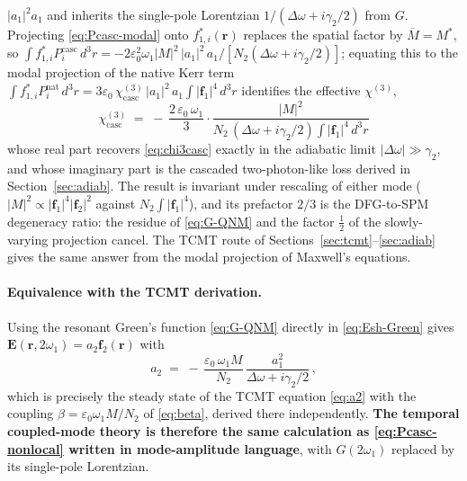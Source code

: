 \documentclass[11pt,a4paper]{article}
\newcommand{\eps}{\varepsilon}
\newcommand{\bvec}[1]{\mathbf{#1}}
\newcommand{\f}{\bvec{f}}
\newcommand{\ri}{\bvec{r}}
\newcommand{\dthreer}{\,d^{3}r}
\newcommand{\chithree}{\chi^{(3)}}
\newcommand{\Dom}{\Delta\omega}
\begin{document}
\begin{itemize}
    $|a_1|^{2}a_1$ and inherits the single-pole Lorentzian
    $1/(\Dom+i\gamma_2/2)$ from $G$.  Projecting \eqref{eq:Pcasc-modal}
    onto $f_{1,i}^{*}(\ri)$ replaces the spatial factor by
    $\overline M=M^{*}$, so $\int f_{1,i}^{*}P_i^{\text{casc}}\dthreer
     =-2\eps_0^2\omega_1|M|^{2}\,|a_1|^{2}\,a_1/[N_2(\Dom+i\gamma_2/2)]$;
    equating this to the modal projection of the native Kerr term
    $\int f_{1,i}^{*}P_i^{\text{nat}}\dthreer
     =3\eps_0\,\chithree_\text{casc}\,|a_1|^{2}\,a_1\!\int|\f_1|^{4}\dthreer$
    identifies the effective $\chithree$,
    \begin{equation}
      \boxed{\;\chithree_{\text{casc}}\;=\;
        -\,\frac{2\,\eps_0\,\omega_1}{3}\cdot
        \frac{|M|^2}{N_2\,(\Dom+i\gamma_2/2)\!\int\!|\f_1|^4\dthreer}\;}
      \label{eq:chi3casc-tensor}
    \end{equation}
    whose real part recovers \eqref{eq:chi3casc} exactly in the
    adiabatic limit $|\Dom|\gg\gamma_2$, and whose imaginary part is
    the cascaded two-photon-like loss derived in
    Section~\ref{sec:adiab}.  The result is invariant under rescaling
    of either mode ($|M|^2\propto|\f_1|^4|\f_2|^2$ against
    $N_2\int|\f_1|^4$), and its prefactor $2/3$ is the DFG-to-SPM
    degeneracy ratio: the residue of \eqref{eq:G-QNM} and the factor
    $\tfrac12$ of the slowly-varying projection cancel.  The TCMT route
    of Sections~\ref{sec:tcmt}--\ref{sec:adiab} gives the same answer
    from the modal projection of Maxwell's equations.
\end{itemize}

\paragraph{Equivalence with the TCMT derivation.}
Using the resonant Green's function \eqref{eq:G-QNM} directly in
\eqref{eq:Esh-Green} gives $\mathbf E(\ri,2\omega_1)=a_2\f_2(\ri)$
with
\begin{equation}
  a_2\;=\;-\,\frac{\eps_0\,\omega_1 M}{N_2}\,\frac{a_1^2}{\Dom+i\gamma_2/2}\,,
\end{equation}
which is precisely the steady state of the TCMT equation
\eqref{eq:a2} with the coupling $\beta=\eps_0\omega_1M/N_2$ of
\eqref{eq:beta}, derived there independently.  \textbf{The temporal coupled-mode
theory is therefore the same calculation as \eqref{eq:Pcasc-nonlocal}
written in mode-amplitude language}, with $G(2\omega_1)$ replaced by
its single-pole Lorentzian.
\end{document}

